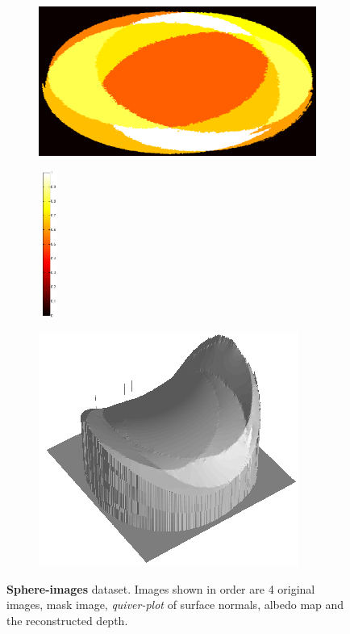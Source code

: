 \documentclass[11pt]{article}
\begin{document}
\begin{figure}[!hbt]
  \begin{subfigure}[h]{0.3\textwidth}
    \centering
    \includegraphics[width = \textwidth]{../sphere-images/albedo.png}
  \end{subfigure} 
  \begin{subfigure}[h]{0.02\linewidth}
    \centering
    \includegraphics[width = 7mm, height = 48mm]{../sphere-images/colorbar.png}
  \end{subfigure} 
    \begin{subfigure}[h]{0.5\textwidth}
    \centering
    \includegraphics[width = \textwidth]{../sphere-images/depthMap.png}
  \end{subfigure} 
   
  \caption{\textbf{Sphere-images} dataset. Images shown in order are 4 original images, mask image, \emph{quiver-plot} of surface normals, albedo map and the reconstructed depth.}
  \label{fig5}
  \end{figure}
\end{document}
